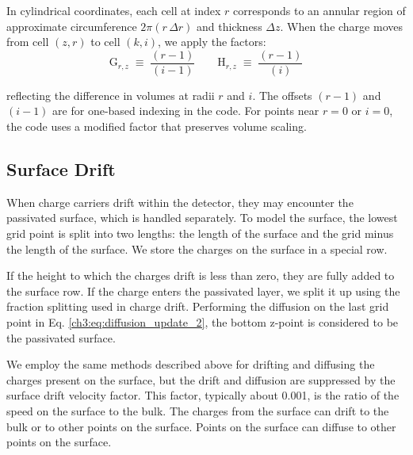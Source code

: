 In cylindrical coordinates, each cell at index $r$ corresponds to an annular region of approximate circumference $2\pi (r \,\Delta r)$ and thickness $\Delta z$. When the charge moves from cell $(z,r)$ to cell $(k,i)$, we apply the factors:
\[
\text{G}_{r,z} \;\equiv\; \frac{(r-1)}{(i-1)}
\qquad
\text{H}_{r,z} \;\equiv\; \frac{(r-1)}{(i)}
\] 

reflecting the difference in volumes at radii $r$ and $i$.
The offsets $(r-1)$ and $(i-1)$ are for one-based indexing in the code. For points near $r=0$ or $i=0$, the code uses a modified factor that preserves volume scaling. 


\subsection{Surface Drift}

When charge carriers drift within the detector, they may encounter the passivated surface, which is handled separately. To model the surface, the lowest grid point is split into two lengths: the length of the surface and the grid minus the length of the surface. We store the charges on the surface in a special row. 

If the height to which the charges drift is less than zero, they are fully added to the surface row. If the charge enters the passivated layer, we split it up using the fraction splitting used in charge drift. Performing the diffusion on the last grid point in Eq. \ref{ch3:eq:diffusion_update_2}, the bottom z-point is considered to be the passivated surface. 


We employ the same methods described above for drifting and diffusing the charges present on the surface, but the drift and diffusion are suppressed by the surface drift velocity factor. This factor, typically about 0.001, is the ratio of the speed on the surface to the bulk. The charges from the surface can drift to the bulk or to other points on the surface. Points on the surface can diffuse to other points on the surface.

